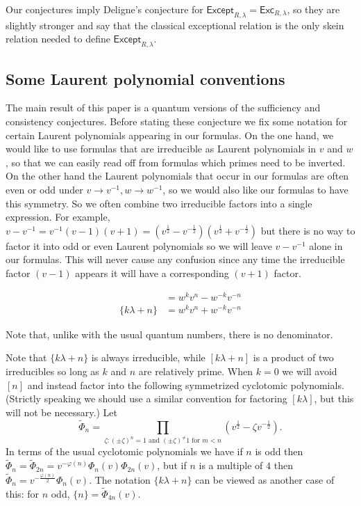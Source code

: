 \documentclass[12pt]{amsart}
\begin{document}
Our conjectures imply Deligne's conjecture for $\mathsf{Except}_{R,\lambda} = \mathsf{Exc}_{R,\lambda}$, so they are slightly stronger and say that the classical exceptional relation is the only skein relation needed to define $\mathsf{Except}_{R,\lambda}$.

\subsection{Some Laurent polynomial conventions}

The main result of this paper is a quantum versions of the sufficiency and consistency conjectures.  
Before stating these conjecture we fix some notation for certain Laurent polynomials appearing in our formulas.  On the one hand, we would like to use formulas that are irreducible as Laurent polynomials in $v$ and $w$, so that we can easily read off from formulas which primes need to be inverted.  On the other hand the Laurent polynomials that occur in our formulas are often even or odd under $v \rightarrow v^{-1}, w \rightarrow w^{-1}$, so we would also like our formulas to have this symmetry.  So we often combine two irreducible factors into a single expression.  For example, $v-v^{-1} = v^{-1}(v-1)(v+1) = (v^{\frac{1}{2}}-v^{-\frac{1}{2}})(v^{\frac{1}{2}}+v^{-\frac{1}{2}})$ but there is no way to factor it into odd or even Laurent polynomials so we will leave $v-v^{-1}$ alone in our formulas.  This will never cause any confusion since any time the irreducible factor $(v-1)$ appears it will have a corresponding $(v+1)$ factor.

\begin{align*}
[k\lambda + n] &= w^kv^n - w^{-k}v^{-n}\\
\{k\lambda + n\} &= w^k v^n + w^{-k} v^{-n}
\end{align*}

\begin{warning}
Note that, unlike with the usual quantum numbers, there is no denominator.
\end{warning}

Note that $\{k\lambda + n\}$ is always irreducible, while $[k\lambda +
n]$ is a product of two irreducibles so long as $k$ and $n$ are
relatively prime.  When
$k=0$ we will avoid $[n]$ and instead factor into the following
symmetrized cyclotomic polynomials.  (Strictly speaking we should use
a similar convention for factoring $[k \lambda]$, but this will not be
necessary.)  Let
\[
  \widetilde{\Phi}_n = \prod_{\zeta: (\pm \zeta)^n = 1 \text{ and } (\pm \zeta)^ \neq 1 \text{ for $m < n$}}
  (v^{\frac{1}{2}}-\zeta v^{-\frac{1}{2}}).
\]
In terms of the usual cyclotomic polynomials we have if $n$ is odd
then $\widetilde{\Phi}_n = \widetilde{\Phi}_{2n} = v^{-\varphi(n)}
\Phi_n(v) \Phi_{2n}(v)$, but if $n$ is a multiple of $4$ then
$\widetilde{\Phi}_n = v^{-\frac{\varphi(n)}{2}} \Phi_n(v)$.
The notation $\{k\lambda + n\}$ can be viewed as another case of this:
for $n$ odd,
$\{n\} = \widetilde{\Phi}_{4n}(v)$.
\end{document}

